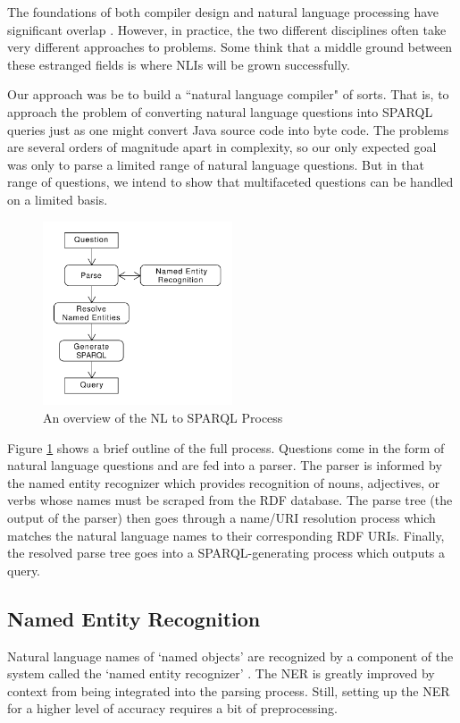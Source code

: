 \documentclass[11pt]{article}
\begin{document}
The foundations of both compiler design and natural language processing
have significant overlap \cite{chomsky, reghizzi}.
However, in practice, the two different disciplines often take very different approaches to 
problems\cite{aho, anatomy, reghizzi}.
Some think \cite{usability} that a middle ground between these estranged fields is where
NLIs will be grown successfully.

Our approach was be to build a ``natural language compiler" of sorts.
That is, to approach the problem of converting natural language questions into
SPARQL queries just as one might convert Java source code into byte code.
The problems are several orders of magnitude apart in complexity, so 
our only expected goal was only to parse a limited range of natural language questions.
But in that range of questions, we intend to show that multifaceted questions
can be handled on a limited basis.

\begin{figure}[h!]
    \centering
    \includegraphics[width=0.5\textwidth,natwidth=1,natheight=1]{umlet/usage.pdf}
    \caption{An overview of the NL to SPARQL Process}
    \label{fig:process}
\end{figure}

Figure \ref{fig:process} shows a brief outline of the full process. Questions come
in the form of natural language questions and are fed into a parser. The parser is
informed by the named entity recognizer which provides recognition of nouns, adjectives,
or verbs whose names must be scraped from the RDF database. The parse tree (the output
of the parser) then goes through a name/URI resolution process which matches the
natural language names to their corresponding RDF URIs. Finally, the resolved parse
tree goes into a SPARQL-generating process which outputs a query.

\subsection{Named Entity Recognition}
Natural language names of `named objects' are recognized by a component of the system
called the `named entity recognizer' \cite{ner1,ner2}. 
The NER is greatly improved by context from being integrated into the parsing process.
Still, setting up the NER for a higher level of accuracy requires a bit of preprocessing.
\end{document}
